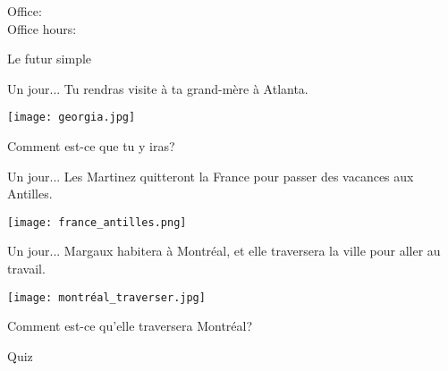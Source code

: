\documentclass{beamer}
\subtitle[Voyages et futur simple]{Les voyages et le futur simple}
\begin{document}
  \begin{frame}
    \titlepage
    \tiny{Office: \\
          Office hours: }
  \end{frame}

  \begin{frame}{Le futur simple}
    \begin{center}
      
    \end{center}
  \end{frame}

  \begin{frame}[t]{Un jour...}
    Tu rendras visite à ta grand-mère à Atlanta.
    \begin{center}
      \texttt{[image: georgia.jpg]}
    \end{center}
    Comment est-ce que tu y iras?
  \end{frame}

  \begin{frame}[t]{Un jour...}
    Les Martinez quitteront la France pour passer des vacances aux Antilles.
    \begin{center}
      \texttt{[image: france\_antilles.png]}
    \end{center}
  \end{frame}

  \begin{frame}[t]{Un jour...}
    Margaux habitera à Montréal, et elle traversera la ville pour aller au travail.
    \begin{center}
      \texttt{[image: montréal\_traverser.jpg]}
    \end{center}
    Comment est-ce qu'elle traversera Montréal?
  \end{frame}

  \begin{frame}{}
    \begin{center}
      \Large Quiz
    \end{center}
  \end{frame}
\end{document}
